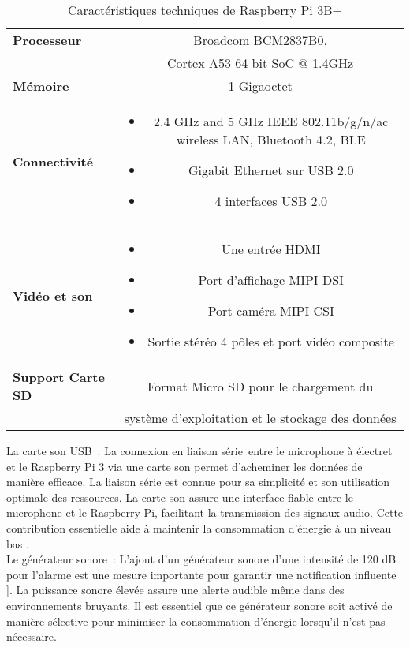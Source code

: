 \begin{table}[H]
	\centering
	\caption{Caractéristiques techniques de Raspberry Pi 3B+}
	\vspace{5mm}
	\begin{tabular}{|l|c|}
		\hline
		\textbf{Processeur} & Broadcom BCM2837B0,\\
		& Cortex-A53 64-bit SoC @ 1.4GHz \\
		\hline
		\textbf{Mémoire} & 1 Gigaoctet \\
		\hline
		\textbf{Connectivité} & 
		\begin{minipage}[t]{0.7\textwidth}
			\begin{itemize}
			
				\item 2.4 GHz and 5 GHz IEEE 802.11b/g/n/ac
				 wireless LAN, Bluetooth 4.2, BLE
				\item Gigabit Ethernet sur USB 2.0
				\item 4 interfaces USB 2.0
				\vspace{3mm}
			\end{itemize}
		\end{minipage} \\
		\hline
		\textbf{Vidéo et son} & 
		\begin{minipage}[t]{0.7\textwidth}
			\begin{itemize}
				
				\item Une entrée HDMI
				\item Port d’affichage MIPI DSI
				\item Port caméra MIPI CSI
				\item Sortie stéréo 4 pôles et port vidéo composite
				\vspace{3mm}
			\end{itemize}
		\end{minipage} \\
		\hline
		\textbf{Support Carte SD} & Format Micro SD pour le chargement du \\
		& système d’exploitation et le stockage des données \\
		\hline
		
	\end{tabular}
\end{table}

La carte son USB : La connexion en liaison série entre le microphone à électret et le Raspberry Pi 3 via une carte son permet d'acheminer les données de manière efficace. La liaison série est connue pour sa simplicité et son utilisation optimale des ressources. La carte son assure une interface fiable entre le microphone et le Raspberry Pi, facilitant la transmission des signaux audio. Cette contribution essentielle aide à maintenir la consommation d'énergie à un niveau bas \cite{68}.
\\
Le générateur sonore : L'ajout d'un générateur sonore d'une intensité de 120 dB pour l'alarme est une mesure importante pour garantir une notification influente \cite{69}]. La puissance sonore élevée assure une alerte audible même dans des environnements bruyants. Il est essentiel que ce générateur sonore soit activé de manière sélective pour minimiser la consommation d'énergie lorsqu'il n'est pas nécessaire.
\\

